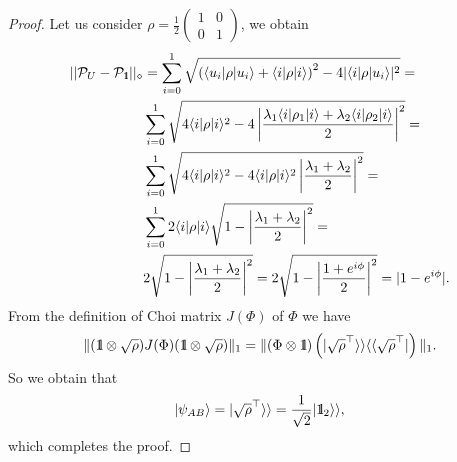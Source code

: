 \documentclass[preprint,12pt, a4paper]{elsarticle}
\newcommand{\ket}[1]{\ensuremath{|#1\rangle}}
\newcommand{\bra}[1]{\ensuremath{\langle#1|}}
\newcommand{\1}{{\rm 1\hspace{-0.9mm}l}}
\newcommand{\Id}{{\rm 1\hspace{-0.9mm}l}}
\newcommand{\PP}{\mathcal{P}}
\newcommand{\diag}{\mathrm{diag}}
\newtheorem{remark}{Remark}
\begin{document}
\begin{proof}
	Let us consider  $\rho =   \frac{1}{2}  	\left(\begin{array}{cc}1&0\\0&1\end{array}\right)  $,   we obtain
	\begin{equation}
	\begin{split}
	||\mathcal{P}_U - \mathcal{P}_{\1}||_\diamond &= \sum_{i=0}^1  
	\sqrt{\left(\bra{u_i}\rho\ket{u_i} + \bra{i} \rho \ket{i} \right)^2 - 
		4|\bra{i}\rho\ket{u_i}|^2} = \\&  \sum_{i=0}^1  \sqrt{4 \bra{i}\rho 
		\ket{i}^2 - 4 \left| \frac{\lambda_1 \bra{i}\rho_1 \ket{i} + 
			\lambda_2\bra{i} \rho_2\ket{i}}{2}\right|^2} =\\&  \sum_{i=0}^1  \sqrt{4 
		\bra{i}\rho \ket{i}^2 - 4 \bra{i} \rho \ket{i}^2\left| \frac{\lambda_1 + 
			\lambda_2}{2}\right|^2} = \\&  \sum_{i=0}^1 2 \bra{i} \rho \ket{i} \sqrt{1 
		-\left| \frac{\lambda_1 + \lambda_2}{2}\right|^2 } = \\& 2 \sqrt{1 -\left| 
		\frac{\lambda_1 + \lambda_2}{2}\right|^2 } = 
	2 \sqrt{1 -\left| \frac{1+e^{i \phi}}{2}\right|^2 } = |1-e^{i \phi }|. 
	\end{split}
	\end{equation}
	From the definition of Choi matrix $J(\Phi)$ of $\Phi$ we have
	\begin{equation}
\| (\Id\otimes \sqrt{\rho} ) J(\Phi)  (\Id\otimes \sqrt{\rho} ) \|_1  =  \| (\Phi \otimes \Id) \left(  | \sqrt{\rho}^\top \rangle  \rangle \langle \langle \sqrt{\rho}^\top | \right) \|_1.
	\end{equation}
	So we obtain that \begin{equation}
	\ket{\psi_{AB}} =   | \sqrt{\rho}^\top \rangle  \rangle = \frac{1}{\sqrt{2} } | \Id_2 \rangle \rangle, 
	\end{equation}
	which completes the proof.
\end{proof}


%
%
\end{document}

